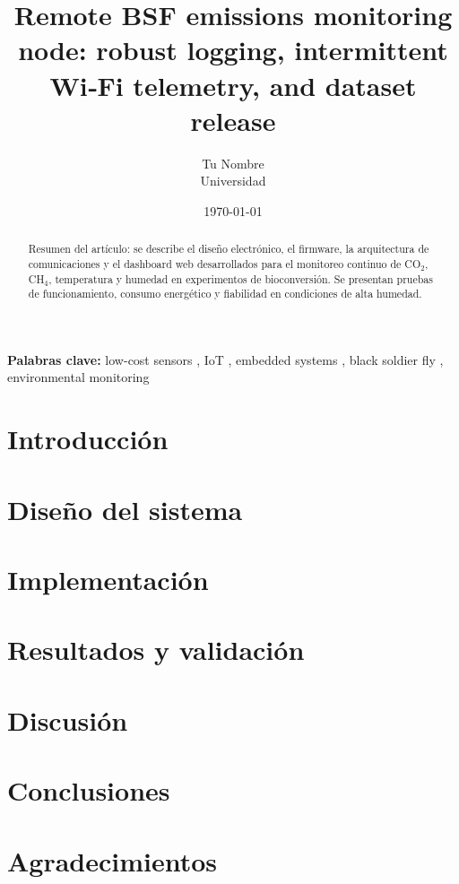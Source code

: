 \documentclass[11pt,a4paper]{article}
\title{Remote BSF emissions monitoring node: robust logging, intermittent Wi‑Fi telemetry, and dataset release}
\author{Tu Nombre \\ Universidad}
\date{\today}
\begin{document}
\maketitle

\begin{abstract}
Resumen del artículo: se describe el diseño electrónico, el firmware, la arquitectura de comunicaciones y el dashboard web desarrollados para el monitoreo continuo de CO$_2$, CH$_4$, temperatura y humedad en experimentos de bioconversión. Se presentan pruebas de funcionamiento, consumo energético y fiabilidad en condiciones de alta humedad.
\end{abstract}

\vspace{0.5cm}
\noindent \textbf{Palabras clave:} low-cost sensors , IoT , embedded systems , black soldier fly , environmental monitoring


\section{Introducción}


\section{Diseño del sistema}


\section{Implementación}


\section{Resultados y validación}


\section{Discusión}


\section{Conclusiones}


\section*{Agradecimientos}

\printbibliography
\end{document}
